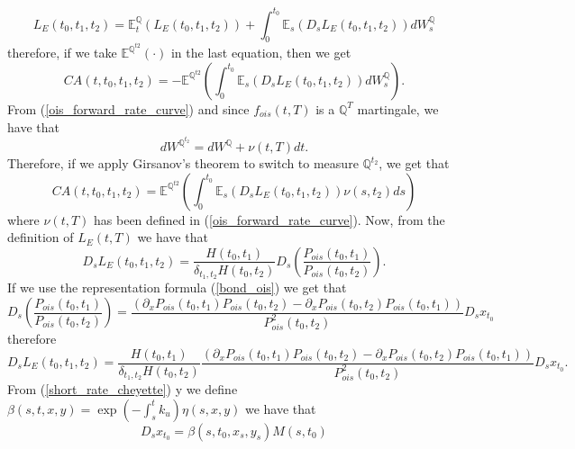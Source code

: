 \documentclass[a4paper,10pt]{article}
\newcommand{\1}{\mathbf{1}}
\begin{document}
\begin{equation}
L_{E}(t_0,t_1,t_2) = \mathbb{E}^{\mathbb{Q}}_t\left(L_{E}(t_0,t_1,t_2)\right) + \int_{0}^{t_0} \mathbb{E}_{s}\left(D_s L_{E}(t_0,t_1,t_2) \right) dW^{\mathbb{Q}}_s
\end{equation} 
therefore, if we take $\mathbb{E}^{\mathbb{Q}^{t2}}(\cdot)$ in the last equation, then we get
\begin{equation*}
CA(t, t_0, t_1, t_2) = - \mathbb{E}^{\mathbb{Q}^{t2}}\left(\int_{0}^{t_0} \mathbb{E}_{s}\left(D_s L_{E}(t_0,t_1,t_2) \right) dW^{\mathbb{Q}}_s \right).
\end{equation*}
From (\ref{ois_forward_rate_curve}) and since $f_{ois}(t,T)$ is a $\mathbb{Q}^{T}$ martingale, we have that
\begin{equation*}
dW^{\mathbb{Q}^{t_2}} = dW^{\mathbb{Q}} + \nu(t,T) dt. 
\end{equation*}
Therefore, if we apply Girsanov's theorem to switch to measure $\mathbb{Q}^{t_2}$, we get that
\begin{equation}\label{ca_general_future}
CA(t, t_0, t_1, t_2) = \mathbb{E}^{\mathbb{Q}^{t2}}\left(\int_{0}^{t_0} \mathbb{E}_{s}\left(D_s L_{E}(t_0,t_1,t_2) \right) \nu(s,t_2) ds \right)
\end{equation}
where $\nu(t,T)$ has been defined in (\ref{ois_forward_rate_curve}). Now, from the definition of $L_{E}(t,T)$ we have that
\begin{equation*}
D_s L_{E}(t_0,t_1,t_2) = \frac{H(t_0,t_1)}{\delta_{t_1,t_2}H(t_0,t_2)} D_s \left(\frac{P_{ois}(t_0,t_1)}{P_{ois}(t_0,t_2)}\right). 
\end{equation*}
If we use the representation formula (\ref{bond_ois}) we get that
\begin{equation*}
D_s \left(\frac{P_{ois}(t_0,t_1)}{P_{ois}(t_0,t_2)}\right) = \frac{\left(\partial_{x}P_{ois}(t_0,t_1)P_{ois}(t_0,t_2) - \partial_{x}P_{ois}(t_0,t_2) P_{ois}(t_0,t_1) \right)}{P^{2}_{ois}(t_0,t_2)} D_s x_{t_0}
\end{equation*}
therefore
\begin{equation}\label{malliavin_derive_L}
D_s L_{E}(t_0,t_1,t_2) = \frac{H(t_0,t_1)}{\delta_{t_1,t_2}H(t_0,t_2)}\frac{\left(\partial_{x}P_{ois}(t_0,t_1)P_{ois}(t_0,t_2) - \partial_{x}P_{ois}(t_0,t_2) P_{ois}(t_0,t_1) \right)}{P^{2}_{ois}(t_0,t_2)} D_s x_{t_0}. 
\end{equation}
From (\ref{short_rate_cheyette}) y we define $\beta(s,t, x, y) = \exp\left(-\int_{s}^{t} k_{u} \right) \eta(s, x, y)$ we have that
\begin{equation}\label{malliavin_derive_x}
D_s x_{t_0} = \beta(s,t_0, x_s, y_s)M(s,t_0)
\end{equation}
\end{document}
